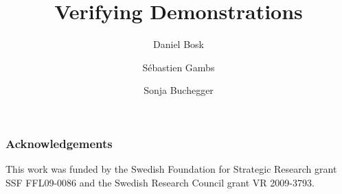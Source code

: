 \title{%
  Verifying Demonstrations
}
\author[D.~Bosk et al.]{%
  Daniel Bosk
  \and
  Sébastien Gambs
  \and
  Sonja Buchegger
}

\maketitle

\mode*

\begin{abstract}
  
\end{abstract}








\subsubsection*{Acknowledgements}

This work was funded by the Swedish Foundation for Strategic Research grant SSF 
FFL09-0086 and the Swedish Research Council grant VR 2009-3793.


\printbibliography{}
